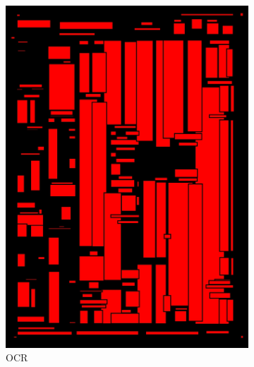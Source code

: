 \documentclass[aspectratio=1610]{beamer}
\begin{document}
\begin{frame}
  \begin{figure}
\centering
\begin{subfigure}{.25\textwidth}
  \centering
  \includegraphics[width=0.99\linewidth, clip=true, trim = 0mm 0mm 0mm 0mm]{figures/ocr/zk6UnuL.jpg}
  \caption{OCR}
\end{subfigure}%
\begin{subfigure}{.25\textwidth}
  \centering

\end{subfigure}
\end{figure}
\end{frame}
\end{document}
